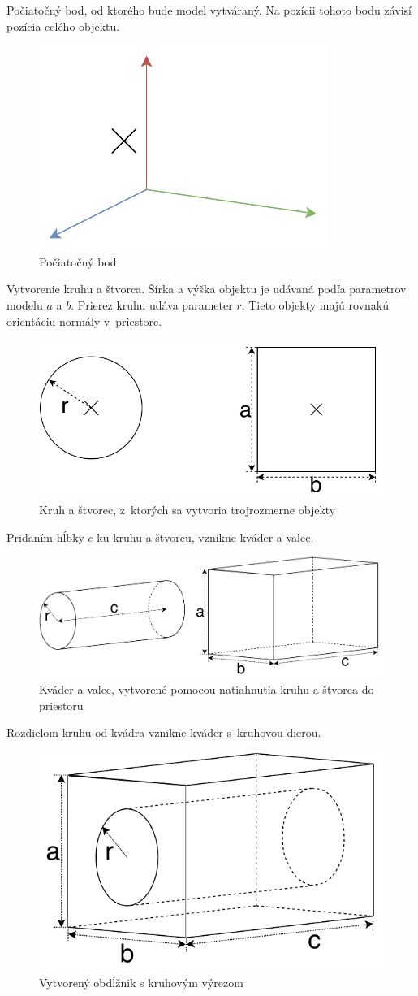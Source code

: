 Počiatočný bod, od ktorého bude model vytváraný. Na pozícii tohoto bodu závisí pozícia celého objektu.\nopagebreak
\begin{figure}[H]
	\centering
	\includegraphics[height=0.3\textwidth]{obrazky-figures/Examples/A1.pdf}
	\caption{Počiatočný bod}
	\label{fig:A1}
\end{figure}
Vytvorenie kruhu a štvorca. Šírka a výška objektu je udávaná podľa parametrov modelu $a$ a $b$. Prierez kruhu udáva parameter $r$. Tieto objekty majú rovnakú orientáciu normály v~priestore.
\nopagebreak
\begin{figure}[H]
	\centering
	\includegraphics[height=0.3\textwidth]{obrazky-figures/Examples/A2.pdf}
	\caption{Kruh a štvorec,  z~ktorých sa vytvoria trojrozmerne objekty}
	\label{fig:A2}
\end{figure}
Pridaním hĺbky $c$ ku kruhu a štvorcu, vznikne kváder a valec.
\nopagebreak
\begin{figure}[H]
	\centering
	\includegraphics[height=0.3\textwidth]{obrazky-figures/Examples/A3.pdf}
	\caption{Kváder a valec, vytvorené pomocou natiahnutia kruhu a štvorca do priestoru}
	\label{fig:A3}
\end{figure}
Rozdielom kruhu od kvádra vznikne kváder s~kruhovou dierou.
\nopagebreak
\begin{figure}[H]
	\centering
	\includegraphics[height=0.3\textwidth]{obrazky-figures/Examples/A4.pdf}
	\caption{Vytvorený obdĺžnik s kruhovým výrezom}
	\label{fig:A4}
\end{figure}

